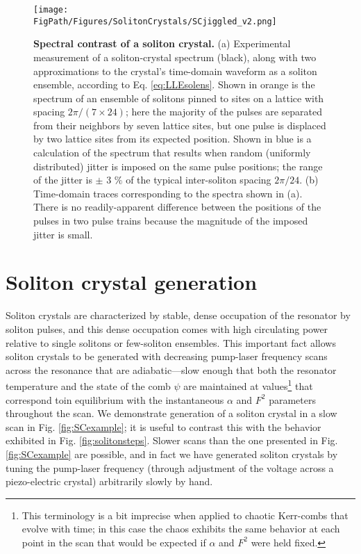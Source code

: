 \begin{figure}[htpb]
	\begin{center}
		\texttt{[image: \\FigPath/Figures/SolitonCrystals/SCjiggled\_v2.png]}
	\end{center}
	\caption[Spectral contrast of a soliton crystal]{\textbf{Spectral contrast of a soliton crystal.} (a) Experimental measurement of a soliton-crystal spectrum (black), along with two approximations to the crystal's time-domain waveform as a soliton ensemble, according to Eq. \ref{eq:LLEsolens}. Shown in orange is the spectrum of an ensemble of solitons pinned to sites on a lattice with spacing $2\pi/(7\times24)$; here the majority of the pulses are separated from their neighbors by seven lattice sites, but one pulse is displaced by two lattice sites from its expected position. Shown in blue is a calculation of the spectrum that results when random (uniformly distributed) jitter is imposed on the same pulse positions; the range of the jitter is $\pm$ 3 $\%$ of the typical inter-soliton spacing $2\pi/24$. (b) Time-domain traces corresponding to the spectra shown in (a). There is no readily-apparent difference between the positions of the pulses in two pulse trains because the magnitude of the imposed jitter is small.}
	\label{fig:SCjiggled}
\end{figure} 

\section{Soliton crystal generation}

Soliton crystals are characterized by stable, dense occupation of the resonator by soliton pulses, and this dense occupation comes with high circulating power relative to single solitons or few-soliton ensembles. This important fact allows soliton crystals to be generated with decreasing pump-laser frequency scans across the resonance that are adiabatic---slow enough that both the resonator temperature and the state of the comb $\psi$ are maintained at values\footnote{This terminology is a bit imprecise when applied to chaotic Kerr-combs that evolve with time; in this case the chaos exhibits the same behavior at each point in the scan that would be expected if $\alpha$ and $F^2$ were held fixed.} that correspond toin equilibrium with the instantaneous $\alpha$ and $F^2$ parameters throughout the scan. We demonstrate generation of a soliton crystal in a slow scan in Fig. \ref{fig:SCexample}; it is useful to contrast this with the behavior exhibited in Fig. \ref{fig:solitonsteps}. Slower scans than the one presented in Fig. \ref{fig:SCexample} are possible, and in fact we have generated soliton crystals by tuning the pump-laser frequency (through adjustment of the voltage across a piezo-electric crystal) arbitrarily slowly by hand.

